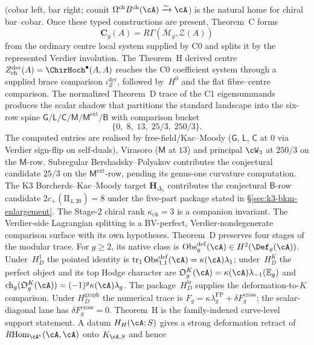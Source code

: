 \textup{(}cobar left, bar right; counit $\Omega^{\mathrm{ch}}
B^{\mathrm{ch}}(\cA) \xrightarrow{\sim} \cA$\textup{)} is the natural
home for chiral bar--cobar.
Once these typed constructions are present, Theorem~C forms
\[
 \mathbf C_g(A)=R\Gamma(\overline{\mathcal M}_g,\mathcal Z(A))
\]
from the ordinary centre local system supplied by C0 and splits it by
the represented Verdier involution.  The Theorem~H derived centre
$Z^{\mathrm{der}}_{\mathrm{ch}}(A)=\ChirHoch^\bullet(A,A)$ reaches the
C0 coefficient system through a supplied brace comparison
$\iota_Z^{\mathrm{der}}$, followed by~$H^0$ and the flat fibre--centre
comparison.  The normalized Theorem~D trace of the C1 eigensummands
produces the scalar shadow that partitions the standard landscape
into the six-row spine
$\mathsf G/\mathsf L/\mathsf C/\mathsf M/\mathsf M^{\mathrm{ext}}/\mathsf B$
with comparison bucket
\[
\{0,\;8,\;13,\;25/3,\;250/3\}.
\]
The computed entries are realised by free-field/Kac--Moody ($\mathsf G$, $\mathsf L$,
$\mathsf C$ at $0$ via Verdier sign-flip on self-duals), Virasoro
($\mathsf M$ at $13$) and principal $\cW_3$ at $250/3$ on the
$\mathsf M$-row.  Subregular Bershadsky--Polyakov contributes the
conjectural candidate $25/3$ on the $\mathsf M^{\mathrm{ext}}$-row,
pending its genus-one curvature computation. The K3 Borcherds--Kac--Moody target
$\mathbf H_{\Delta_5}$ contributes the conjectural $\mathsf B$-row
candidate $2c_+(\mathrm{II}_{4,20})=8$ under the five-part package
stated in \S\ref{sec:k3-bkm-enlargement}.  The Stage-2 chiral rank
$\kappa_{\mathrm{ch}}=3$ is a companion invariant. The Verdier-side
Lagrangian splitting is a BV-perfect, Verdier-nondegenerate comparison
surface with its own hypotheses.  Theorem~D preserves four stages of
the modular trace.  For $g\geq2$, its native class is
$\operatorname{Obs}^{\mathrm{def}}_g(\cA)\in H^2(\Def_g(\cA))$.
Under~$H_D^1$ the pointed identity is
$\operatorname{tr}_1\operatorname{Obs}^{\mathrm{def}}_{1,1}(\cA)
=\kappa(\cA)\lambda_1$; under~$H_D^K$ the perfect object and its top
Hodge character are
$\mathfrak O_g^K(\cA)=\kappa(\cA)\lambda_{-1}(\mathbb E_g)$ and
$\operatorname{ch}_g(\mathfrak O_g^K(\cA))=
(-1)^g\kappa(\cA)\lambda_g$.  The package~$H_D^{\mathrm{tr}}$
supplies the deformation-to-$K$ comparison.  Under
$H_D^{\mathrm{graph}}$ the numerical trace is
$F_g=\kappa\lambda_g^{\mathrm{FP}}+\delta F_g^{\mathrm{cross}}$;
the scalar-diagonal lane has $\delta F_g^{\mathrm{cross}}=0$.
Theorem~H is the family-indexed
curve-level support statement.  A datum $H_H(\cA;S)$ gives a strong
deformation retract of
$R\!\operatorname{Hom}_{\cA^e}(\cA,\cA)$ onto $K_{\cA,S}$ and hence
